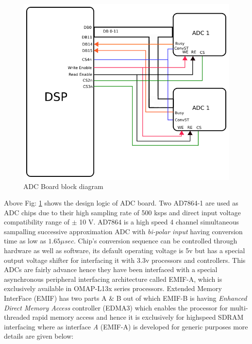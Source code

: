 \begin{figure}[ht]
\includegraphics[width=\columnwidth]{fig/ADC_board.png}
\caption{ADC Board block diagram}
\label{fig:adc_board}
\end{figure}
Above Fig: \ref{fig:adc_board} shows the design logic of ADC board. Two AD7864-1 are used as ADC chips due to their high sampling rate of 500 ksps and direct input voltage compatibility range of $\pm$ 10 V. AD7864 is a high speed 4 channel simultaneous sampalling successive approximation ADC with \textit{bi-polar input} having conversion time as low as $1.65 \mu sec$. Chip's conversion sequence can be controlled through hardware as well as software, its default operating voltage is 5v but has a special output voltage shifter for interfacing it with 3.3v processors and controllers. This ADCs are fairly advance hence they have been interfaced with a special asynchronous peripheral interfacing architecture called EMIF-A, which is exclusively available in OMAP-L13x series processors. Extended Memory InterFace (EMIF) has two parts A \& B out of which EMIF-B is having \textit{Enhanced Direct Memory Access} controller (EDMA3) which enables the processor for multi-threaded rapid memory access and hence it is exclusively for highspeed SDRAM interfacing where as interface \textit{A} (EMIF-A) is developed for generic purposes more details are given below:

